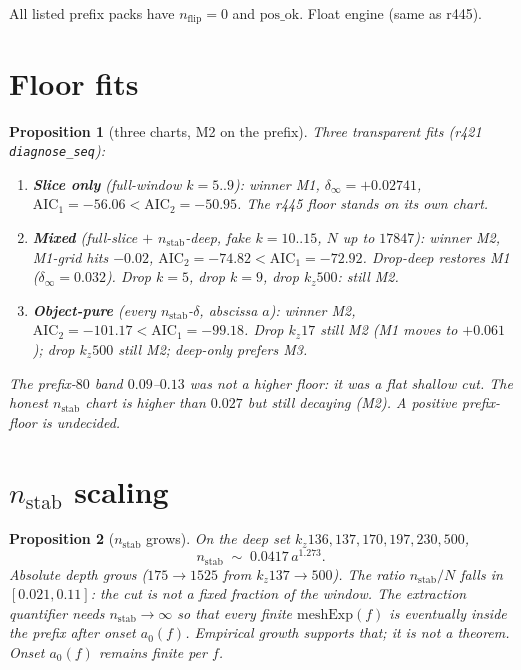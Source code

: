 \documentclass[11pt]{article}
\newtheorem{prop}{Proposition}
\begin{document}
All listed prefix packs have $n_{\mathrm{flip}}=0$
and $\mathrm{pos\_ok}$.  Float engine (same as r445).

\section{Floor fits}\label{sec:fit}

\begin{prop}[three charts, M2 on the prefix]\label{prop:fit}
Three transparent fits (r421 \texttt{diagnose\_seq}):
\begin{enumerate}
\item \textbf{Slice only} (full-window $k=5..9$):
winner M1, $\delta_{\infty}=+0.02741$,
$\mathrm{AIC}_1=-56.06 < \mathrm{AIC}_2=-50.95$.
The r445 floor stands on its own chart.
\item \textbf{Mixed} (full-slice $+$ $n_{\mathrm{stab}}$-deep,
fake $k=10..15$, $N$ up to $17847$):
winner M2, M1-grid hits $-0.02$,
$\mathrm{AIC}_2=-74.82 < \mathrm{AIC}_1=-72.92$.
Drop-deep restores M1 ($\delta_{\infty}=0.032$).
Drop $k=5$, drop $k=9$, drop $k_z500$: still M2.
\item \textbf{Object-pure} (every $n_{\mathrm{stab}}$-$\delta$,
abscissa $a$):
winner M2, $\mathrm{AIC}_2=-101.17 < \mathrm{AIC}_1=-99.18$.
Drop $k_z17$ still M2 (M1 moves to $+0.061$);
drop $k_z500$ still M2; deep-only prefers M3.
\end{enumerate}
The prefix-$80$ band $0.09$--$0.13$ was not a
higher floor: it was a flat shallow cut.
The honest $n_{\mathrm{stab}}$ chart is higher
than $0.027$ but still decaying (M2).
A positive prefix-floor is undecided.
\end{prop}

\section{$n_{\mathrm{stab}}$ scaling}\label{sec:scale}

\begin{prop}[$n_{\mathrm{stab}}$ grows]\label{prop:scale}
On the deep set $k_z136,137,170,197,230,500$,
\[
n_{\mathrm{stab}}\;\sim\;0.0417\,a^{1.273}.
\]
Absolute depth grows ($175\to 1525$ from
$k_z137\to 500$).
The ratio $n_{\mathrm{stab}}/N$ falls in
$[0.021,0.11]$: the cut is not a fixed fraction
of the window.
The extraction quantifier needs
$n_{\mathrm{stab}}\to\infty$ so that every
finite $\mathrm{meshExp}(f)$ is eventually
inside the prefix after onset $a_0(f)$.
Empirical growth supports that; it is not a
theorem.  Onset $a_0(f)$ remains finite per $f$.
\end{prop}
\end{document}
